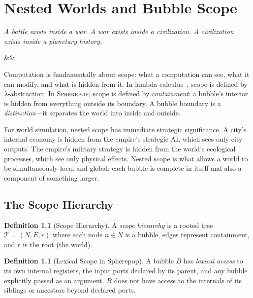 \documentclass[11pt,a4paper,openany]{book}
\theoremstyle{plain}
\theoremstyle{definition}
\newtheorem{definition}[theorem]{Definition}
\theoremstyle{remark}
\newenvironment{background}{%
  \begin{mdframed}[
    linecolor=sphereblue!40, backgroundcolor=sphereblue!5,
    linewidth=1pt, innertopmargin=8pt, innerbottommargin=8pt,
    innerleftmargin=10pt, innerrightmargin=10pt,
    skipabove=10pt, skipbelow=6pt
  ]%
  \setlength{\parindent}{0pt}%
  \noindent{\textcolor{sphereblue}{\textbf{Background}}}\par\smallskip\ignorespaces
}{\end{mdframed}}
\newcommand{\Spbox}{\textsc{Spherepop}\xspace}
\newcommand{\Spbox}{\textbf{Spherepop}\xspace}
\newcommand{\chapterquote}[2]{%
  \par\vspace{0.8em}%
  \begin{flushright}%
    \begin{minipage}{0.65\textwidth}%
      {\itshape #1\par}%
      \ifx&#2&\else\vspace{0.3em}{\raggedleft\small--- #2\par}\fi%
    \end{minipage}%
  \end{flushright}%
  \vspace{0.8em}\par\noindent}
\begin{document}
\chapter{Nested Worlds and Bubble Scope}
\label{ch:nesting}

\chapterquote{A battle exists inside a war.
  A war exists inside a civilization.
  A civilization exists inside a planetary history.
}{}

\begin{background}
  Computation is fundamentally about scope: what a computation can see,
  what it can modify, and what is hidden from it. In lambda
  calculus~\cite{Barendregt}, scope is defined by $\lambda$-abstraction.
  In \Spbox , scope is defined by \emph{containment}: a bubble's interior
  is hidden from everything outside its boundary. A bubble boundary is
  a \emph{distinction}---it separates the world into inside and outside.

  For world simulation, nested scope has immediate strategic significance.
  A city's internal economy is hidden from the empire's strategic AI,
  which sees only city outputs. The empire's military strategy is hidden
  from the world's ecological processes, which see only physical effects.
  Nested scope is what allows a world to be simultaneously local and
  global: each bubble is complete in itself and also a component of
  something larger.
\end{background}

\section{The Scope Hierarchy}

\begin{definition}[Scope Hierarchy]
  A \emph{scope hierarchy} is a rooted tree $\mathcal{T} = (N, E, r)$
  where each node $n \in N$ is a bubble, edges represent containment,
  and $r$ is the root (the world).
\end{definition}

\begin{definition}[Lexical Scope in Spherepop]
  A bubble $B$ has \emph{lexical access} to its own internal registers,
  the input ports declared by its parent, and any bubble explicitly
  passed as an argument. $B$ does not have access to the internals of
  its siblings or ancestors beyond declared ports.
\end{definition}
\end{document}
